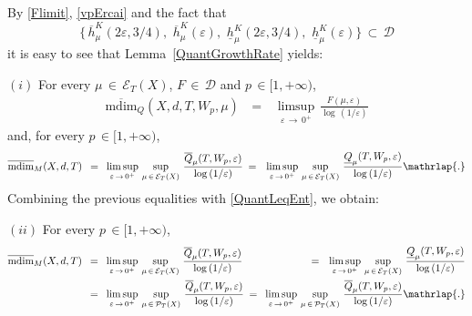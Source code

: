 \documentclass[11pt,a4paper,reqno]{amsart}
\theoremstyle{plain}
\theoremstyle{definition}
\newcommand{\ep} {\varepsilon}
\newcommand{\cD}{{\mathcal D}}
\newcommand{\cE}{{\mathcal E}}
\newcommand{\mdim}{\mathrm{mdim}}
\begin{document}
By \eqref{Flimit}, \eqref{vpErcai} and the fact that 
$$\Big\{\,\overline{h}^K_\mu(2\ep,3/4),\,\, \overline{h}^K_\mu(\ep),\,\,\underline{h}^K_\mu(2\ep,3/4),\,\,
\underline{h}^K_\mu(\ep)\Big\} \,\subset \,\cD$$ 
it is easy to see that Lemma~\ref{QuantGrowthRate} yields:

\medskip


\noindent $(i)$ For every $\mu\,\in\,\cE_T(X)$, $F\,\in\,\cD$ and $p\,\in[1, +\infty)$,
\begin{eqnarray*}
\overline{\mathrm{mdim}}_Q(X,d,T,W_p,\mu) &\,=\,& \limsup_{\ep\,\to\,0^+}\,\frac{F(\mu,\ep)}{\log\,(1/\ep)} %
\end{eqnarray*}
and, for every $p\,\in[1, +\infty)$,
\begin{equation*}
    \begin{alignedat}{3}
        \overline{\mdim}_M(X,d,T) \, \,\,&=\,\,\, \limsup_{\varepsilon \, \to \, 0^+}\, \sup_{\mu \,\in\, \mathcal{E}_T(X)} \, \frac{\overline{Q}_\mu(T, W_p,\ep)}{\log\,(1/\varepsilon)} \, \,\,&=\,\,\,\, \limsup_{\varepsilon \, \to \, 0^+}\, \sup_{\mu \,\in\, \mathcal{E}_T(X)} \, \frac{\underline{Q}_\mu(T, W_p,\ep)}{\log\,(1/\varepsilon)}
        \mathrlap{.}
    \end{alignedat}
\end{equation*} 
\smallskip
Combining the previous equalities with \eqref{QuantLeqEnt}, we obtain:

\medskip

\noindent $(ii)$ For every $p\,\in[1, +\infty)$,
\begin{equation*}
    \begin{alignedat}{3}
        \overline{\mdim}_M(X,d,T) \, \,\,&=\,\,\, \limsup_{\varepsilon \, \to \, 0^+}\, \sup_{\mu \,\in\, \mathcal{E}_T(X)} \, \frac{\overline{Q}_\mu(T,W_p,\ep)}{\log\,(1/\varepsilon)} \, \,\,&=\,\,\,\, \limsup_{\varepsilon \, \to \, 0^+}\, \sup_{\mu \,\in\, \mathcal{E}_T(X)} \, \frac{\underline{Q}_\mu(T,W_p,\ep)}{\log\,(1/\varepsilon)}
        \\
        &=\,\, \,\limsup_{\varepsilon \, \to \, 0^+}\, \sup_{\mu \,\in\, \mathcal{P}_T(X)} \, \frac{\overline{Q}_\mu(T,W_p,\ep)}{\log\,(1/\varepsilon)} \,\, \,&=\,\,\, \limsup_{\varepsilon \, \to \, 0^+}\, \sup_{\mu \,\in\, \mathcal{P}_T(X)} \, \frac{\overline{Q}_\mu(T,W_p,\ep)}{\log\,(1/\varepsilon)}
        \mathrlap{.}
    \end{alignedat}
\end{equation*} 
\end{document}

